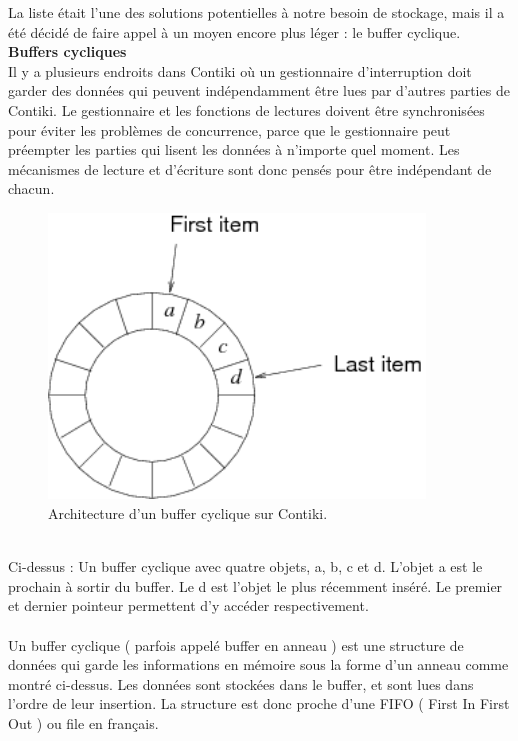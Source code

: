 				La liste était l'une des solutions potentielles à notre besoin de stockage, mais il a été décidé de faire appel à un moyen encore plus léger : le buffer cyclique.
			\clearpage
			\textbf{Buffers cycliques}\\
				Il y a plusieurs endroits dans Contiki où un gestionnaire d'interruption doit garder des données qui peuvent indépendamment être lues par d'autres parties de Contiki. Le gestionnaire et les fonctions de lectures doivent être synchronisées pour éviter les problèmes de concurrence, parce que le gestionnaire peut préempter les parties qui lisent les données à n'importe quel moment. Les mécanismes de lecture et d'écriture sont donc pensés pour être indépendant de chacun.\\
				\begin{figure}[htp]
					\centering
					\includegraphics[width=10cm]{images/ringbuf}
					\caption{Architecture d'un buffer cyclique sur Contiki.}
					\label{fig:ringbuf}
				\end{figure}\\
				Ci-dessus : Un buffer cyclique avec quatre objets, a, b, c et d. L'objet a est le prochain à sortir du buffer. Le d est l'objet le plus récemment inséré. Le premier et dernier pointeur permettent d'y accéder respectivement.\\\\
				Un buffer cyclique ( parfois appelé buffer en anneau ) est une structure de données qui garde les informations en mémoire sous la forme d'un anneau comme montré ci-dessus. Les données sont stockées dans le buffer, et sont lues dans l'ordre de leur insertion. La structure est donc proche d'une FIFO ( First In First Out ) ou file en français.\\
